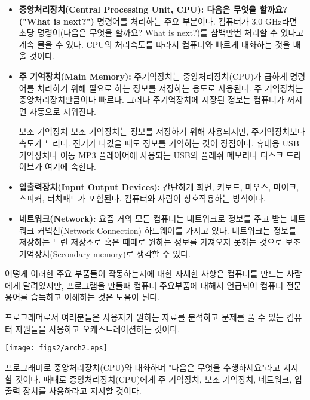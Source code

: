 \begin{itemize}

\item {\bf 중앙처리장치(Central Processing Unit, CPU): 다음은 무엇을 할까요? ("What is next?")} 명령어를 처리하는 주요 부분이다. 컴퓨터가 3.0 GHz라면 초당 명령어(다음은 무엇을 할까요? What is next?)를 삼백만번 처리할 수 있다고 계속 물을 수 있다. CPU의 처리속도를 따라서 컴퓨터와 빠르게 대화하는 것을 배울 것이다.

\item {\bf 주 기억장치(Main Memory):} 주기억장치는 중앙처리장치(CPU)가 급하게 명령어를 처리하기 위해 필요로 하는 정보를 저장하는 용도로 사용된다. 주 기억장치는 중앙처리장치만큼이나 빠르다. 그러나 주기억장치에 저장된 정보는 컴퓨터가 꺼지면 자동으로 지워진다.

\item[보조 기억장치] 보조 기억장치는 정보를 저장하기 위해 사용되지만, 주기억장치보다 속도가 느리다. 
전기가 나갔을 때도 정보를 기억하는 것이 장점이다. 휴대용 USB 기억장치나 이동 MP3 플레이어에 사용되는 USB의 플래쉬 메모리나 디스크 드라이브가 여기에 속한다.
 
\item {\bf 입출력장치(Input Output Devices):} 간단하게 화면, 키보드, 마우스, 마이크, 스피커, 터치패드가 포함된다. 컴퓨터와 사람이 상호작용하는 방식이다.

\item {\bf 네트워크(Network):} 요즘 거의 모든 컴퓨터는 네트워크로 정보를 주고 받는 네트쿼크 커넥션(Network Connection) 하드웨어를 가지고 있다. 네트워크는 정보를 저장하는 느린 저장소로 혹은 때때로 원하는 정보를 가져오지 못하는 것으로 보조 기억장치(Secondary memory)로 생각할 수 있다.

\end{itemize}
 

어떻게 이러한 주요 부품들이 작동하는지에 대한 자세한 사항은 컴퓨터를 만드는 사람에게 달려있지만, 프로그램을 만들때 컴퓨터 주요부품에 대해서 언급되어 컴퓨터 전문용어를 습득하고 이해하는 것은 도움이 된다.

프로그래머로서 여러분들은 사용자가 원하는 자료를 분석하고 문제를 풀 수 있는 컴퓨터 자원들을 사용하고 오케스트레이션하는 것이다.


\beforefig
\centerline{\texttt{[image: figs2/arch2.eps]}}
\afterfig

프로그래머로 중앙처리장치(CPU)와 대화하며 "다음은 무엇을 수행하세요"라고 지시할 것이다. 때때로 중앙처리장치(CPU)에게 주 기억장치, 보조 기억장치, 네트워크, 입출력 장치를 사용하라고 지시할 것이다.

